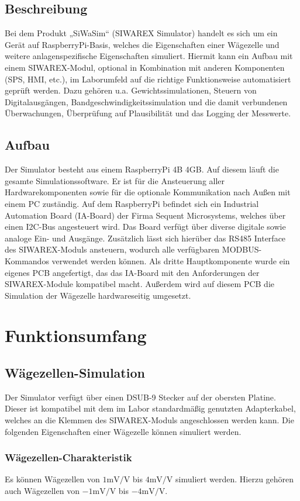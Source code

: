 \documentclass[12pt, a4paper]{report}
\begin{document}
\section{Beschreibung}
Bei dem Produkt „SiWaSim“ (SIWAREX Simulator) handelt es sich um ein Gerät auf RaspberryPi-Basis, welches die Eigenschaften einer Wägezelle und weitere anlagenspezifische Eigenschaften simuliert. Hiermit kann ein Aufbau mit einem SIWAREX-Modul, optional in Kombination mit anderen Komponenten (SPS, HMI, etc.), im Laborumfeld auf die richtige Funktionsweise automatisiert geprüft werden. Dazu gehören u.a. Gewichtssimulationen, Steuern von Digitalausgängen, Bandgeschwindigkeitssimulation und die damit verbundenen Überwachungen, Überprüfung auf Plausibilität und das Logging der Messwerte.
\section{Aufbau}
Der Simulator besteht aus einem RaspberryPi 4B 4GB. Auf diesem läuft die gesamte Simulationssoftware. Er ist für die Ansteuerung aller Hardwarekomponenten sowie für die optionale Kommunikation nach Außen mit einem PC zuständig. Auf dem RaspberryPi befindet sich ein Industrial Automation Board (IA-Board) der Firma Sequent Microsystems, welches über einen I2C-Bus angesteuert wird. Das Board verfügt über diverse digitale sowie analoge Ein- und Ausgänge. Zusätzlich lässt sich hierüber das RS485 Interface des SIWAREX-Moduls ansteuern, wodurch alle verfügbaren MODBUS-Kommandos verwendet werden können. Als dritte Hauptkomponente wurde ein eigenes PCB angefertigt, das das IA-Board mit den Anforderungen der SIWAREX-Module kompatibel macht. Außerdem wird auf diesem PCB die Simulation der Wägezelle hardwareseitig umgesetzt.
\chapter{Funktionsumfang}
\section{Wägezellen-Simulation}
Der Simulator verfügt über einen DSUB-9 Stecker auf der obersten Platine. Dieser ist kompatibel mit dem im Labor standardmäßig genutzten Adapterkabel, welches an die Klemmen des SIWAREX-Moduls angeschlossen werden kann. Die folgenden Eigenschaften einer Wägezelle können simuliert werden.
\subsection{Wägezellen-Charakteristik}
Es können Wägezellen von $1\mathrm{mV/V}$ bis $4\mathrm{mV/V}$ simuliert werden. Hierzu gehören auch Wägezellen von $-1\mathrm{mV/V}$ bis $-4\mathrm{mV/V}$.
\end{document}

